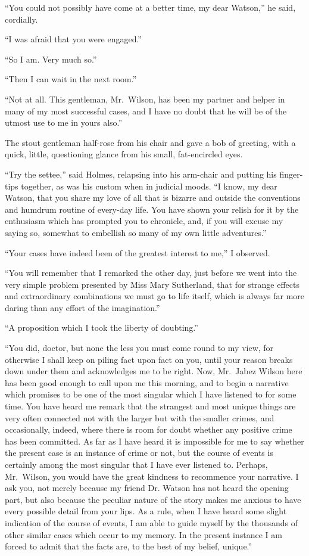 “You could not possibly have come at a better time, my
dear Watson,” he said, cordially.

“I was afraid that you were engaged.”

“So I am. Very much so.”

“Then I can wait in the next room.”

“Not at all. This gentleman, Mr.~Wilson, has been my
partner and helper in many of my most successful cases, and
I have no doubt that he will be of the utmost use to me in
yours also.”

The stout gentleman half-rose from his chair and gave a
bob of greeting, with a quick, little, questioning glance from
his small, fat-encircled eyes.

“Try the settee,” said Holmes, relapsing into his arm-chair
and putting his finger-tips together, as was his custom when
in judicial moods. “I know, my dear Watson, that you share
my love of all that is bizarre and outside the conventions and
humdrum routine of every-day life. You have shown your
relish for it by the enthusiasm which has prompted you to
chronicle, and, if you will excuse my saying so, somewhat to
embellish so many of my own little adventures.”

“Your cases have indeed been of the greatest interest to
me,” I observed.

“You will remember that I remarked the other day, just
before we went into the very simple problem presented by
Miss Mary Sutherland, that for strange effects and extraordinary
combinations we must go to life itself, which is always
far more daring than any effort of the imagination.”

“A proposition which I took the liberty of doubting.”

“You did, doctor, but none the less you must come round
to my view, for otherwise I shall keep on piling fact upon fact
on you, until your reason breaks down under them and acknowledges
me to be right. Now, Mr.~Jabez Wilson here has
been good enough to call upon me this morning, and to begin
a narrative which promises to be one of the most singular
which I have listened to for some time. You have heard me
remark that the strangest and most unique things are very
often connected not with the larger but with the smaller
crimes, and occasionally, indeed, where there is room for
doubt whether any positive crime has been committed. As
far as I have heard it is impossible for me to say whether the
present case is an instance of crime or not, but the course of
events is certainly among the most singular that I have ever
listened to. Perhaps, Mr.~Wilson, you would have the great
kindness to recommence your narrative. I ask you, not
merely because my friend Dr. Watson has not heard the
opening part, but also because the peculiar nature of the story
makes me anxious to have every possible detail from your
lips. As a rule, when I have heard some slight indication of
the course of events, I am able to guide myself by the thousands
of other similar cases which occur to my memory. In
the present instance I am forced to admit that the facts are,
to the best of my belief, unique.”

